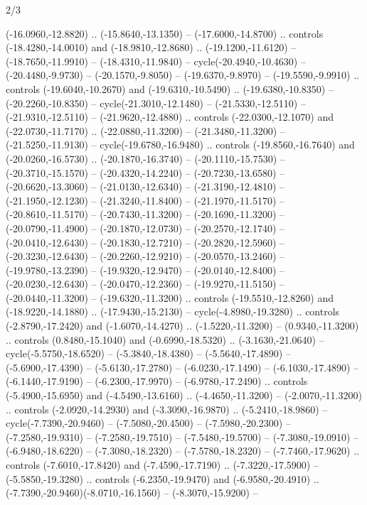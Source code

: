 \begin{flagdescription}{2/3}
\begin{scope}[xshift=0.5\flaglength,yshift=0.5\flagwidth,scale=\flagwidth/480]
\begin{scope}[y=0.80pt, x=0.80pt, yscale=-1,shift={(-450,-300)}]
  (-16.0960,-12.8820) .. (-15.8640,-13.1350) -- (-17.6000,-14.8700) .. controls
  (-18.4280,-14.0010) and (-18.9810,-12.8680) .. (-19.1200,-11.6120) --
  (-18.7650,-11.9910) -- (-18.4310,-11.9840) -- cycle(-20.4940,-10.4630) --
  (-20.4480,-9.9730) -- (-20.1570,-9.8050) -- (-19.6370,-9.8970) --
  (-19.5590,-9.9910) .. controls (-19.6040,-10.2670) and (-19.6310,-10.5490) ..
  (-19.6380,-10.8350) -- (-20.2260,-10.8350) -- cycle(-21.3010,-12.1480) --
  (-21.5330,-12.5110) -- (-21.9310,-12.5110) -- (-21.9620,-12.4880) .. controls
  (-22.0300,-12.1070) and (-22.0730,-11.7170) .. (-22.0880,-11.3200) --
  (-21.3480,-11.3200) -- (-21.5250,-11.9130) -- cycle(-19.6780,-16.9480) ..
  controls (-19.8560,-16.7640) and (-20.0260,-16.5730) .. (-20.1870,-16.3740) --
  (-20.1110,-15.7530) -- (-20.3710,-15.1570) -- (-20.4320,-14.2240) --
  (-20.7230,-13.6580) -- (-20.6620,-13.3060) -- (-21.0130,-12.6340) --
  (-21.3190,-12.4810) -- (-21.1950,-12.1230) -- (-21.3240,-11.8400) --
  (-21.1970,-11.5170) -- (-20.8610,-11.5170) -- (-20.7430,-11.3200) --
  (-20.1690,-11.3200) -- (-20.0790,-11.4900) -- (-20.1870,-12.0730) --
  (-20.2570,-12.1740) -- (-20.0410,-12.6430) -- (-20.1830,-12.7210) --
  (-20.2820,-12.5960) -- (-20.3230,-12.6430) -- (-20.2260,-12.9210) --
  (-20.0570,-13.2460) -- (-19.9780,-13.2390) -- (-19.9320,-12.9470) --
  (-20.0140,-12.8400) -- (-20.0230,-12.6430) -- (-20.0470,-12.2360) --
  (-19.9270,-11.5150) -- (-20.0440,-11.3200) -- (-19.6320,-11.3200) .. controls
  (-19.5510,-12.8260) and (-18.9220,-14.1880) .. (-17.9430,-15.2130) --
  cycle(-4.8980,-19.3280) .. controls (-2.8790,-17.2420) and (-1.6070,-14.4270)
  .. (-1.5220,-11.3200) -- (0.9340,-11.3200) .. controls (0.8480,-15.1040) and
  (-0.6990,-18.5320) .. (-3.1630,-21.0640) -- cycle(-5.5750,-18.6520) --
  (-5.3840,-18.4380) -- (-5.5640,-17.4890) -- (-5.6900,-17.4390) --
  (-5.6130,-17.2780) -- (-6.0230,-17.1490) -- (-6.1030,-17.4890) --
  (-6.1440,-17.9190) -- (-6.2300,-17.9970) -- (-6.9780,-17.2490) .. controls
  (-5.4900,-15.6950) and (-4.5490,-13.6160) .. (-4.4650,-11.3200) --
  (-2.0070,-11.3200) .. controls (-2.0920,-14.2930) and (-3.3090,-16.9870) ..
  (-5.2410,-18.9860) -- cycle(-7.7390,-20.9460) -- (-7.5080,-20.4500) --
  (-7.5980,-20.2300) -- (-7.2580,-19.9310) -- (-7.2580,-19.7510) --
  (-7.5480,-19.5700) -- (-7.3080,-19.0910) -- (-6.9480,-18.6220) --
  (-7.3080,-18.2320) -- (-7.5780,-18.2320) -- (-7.7460,-17.9620) .. controls
  (-7.6010,-17.8420) and (-7.4590,-17.7190) .. (-7.3220,-17.5900) --
  (-5.5850,-19.3280) .. controls (-6.2350,-19.9470) and (-6.9580,-20.4910) ..
  (-7.7390,-20.9460)(-8.0710,-16.1560) -- (-8.3070,-15.9200) --

\end{scope}
\end{scope}
\end{flagdescription}
